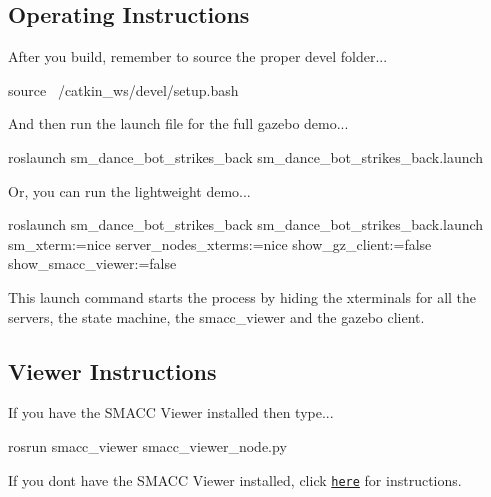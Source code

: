  \subsection*{Operating Instructions}

After you build, remember to source the proper devel folder...


\begin{DoxyCode}
source ~/catkin\_ws/devel/setup.bash
\end{DoxyCode}


And then run the launch file for the full gazebo demo...


\begin{DoxyCode}
roslaunch sm\_dance\_bot\_strikes\_back sm\_dance\_bot\_strikes\_back.launch
\end{DoxyCode}


Or, you can run the lightweight demo...


\begin{DoxyCode}
roslaunch sm\_dance\_bot\_strikes\_back sm\_dance\_bot\_strikes\_back.launch sm\_xterm:=nice
       server\_nodes\_xterms:=nice show\_gz\_client:=false show\_smacc\_viewer:=false
\end{DoxyCode}


This launch command starts the process by hiding the xterminals for all the servers, the state machine, the smacc\+\_\+viewer and the gazebo client.

\subsection*{Viewer Instructions}

If you have the S\+M\+A\+CC Viewer installed then type...


\begin{DoxyCode}
rosrun smacc\_viewer smacc\_viewer\_node.py
\end{DoxyCode}


If you don\textquotesingle{}t have the S\+M\+A\+CC Viewer installed, click \href{http://smacc.ninja/smacc-viewer/}{\tt here} for instructions. 